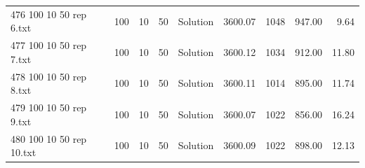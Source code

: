 \begin{longtable}{lrrllrrrr}
476 100 10 50 rep 6.txt & 100 & 10 & 50 & Solution & 3600.07 & 1048 & 947.00 &  9.64\\
477 100 10 50 rep 7.txt & 100 & 10 & 50 & Solution & 3600.12 & 1034 & 912.00 & 11.80\\
478 100 10 50 rep 8.txt & 100 & 10 & 50 & Solution & 3600.11 & 1014 & 895.00 & 11.74\\
479 100 10 50 rep 9.txt & 100 & 10 & 50 & Solution & 3600.07 & 1022 & 856.00 & 16.24\\
480 100 10 50 rep 10.txt & 100 & 10 & 50 & Solution & 3600.09 & 1022 & 898.00 & 12.13\\
\end{longtable}

